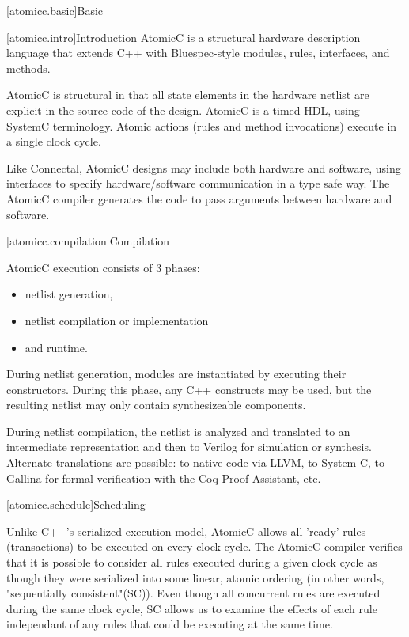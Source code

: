 [atomicc.basic]{Basic}

[atomicc.intro]{Introduction}
AtomicC is a structural hardware description language that extends C++
with Bluespec-style\cite{Bluespec:www,Hoe:Thesis,HoeArvind:TRS_Synthesis2}
modules, rules, interfaces, and methods.

AtomicC is structural in that all state elements in the hardware
netlist are explicit in the source code of the design. AtomicC is a
timed HDL, using SystemC terminology. 
Atomic actions (rules and method invocations) execute in a single clock cycle.

Like Connectal, AtomicC designs may include both hardware and
software, using interfaces to specify hardware/software communication
in a type safe way. The AtomicC compiler generates the code to pass
arguments between hardware and software.

[atomicc.compilation]{Compilation}

AtomicC execution consists of 3 phases:
\begin{itemize}
\item netlist generation, 
\item netlist compilation or implementation
\item and runtime.
\end{itemize}

During netlist
generation, modules are instantiated by executing their
constructors. During this phase, any C++ constructs may be used, but
the resulting netlist may only contain synthesizeable components.

During netlist compilation, the netlist is analyzed and translated to
an intermediate representation and then to Verilog for simulation or
synthesis. Alternate translations are possible: to native code via
LLVM, to System C, to Gallina for formal verification with the Coq
Proof Assistant, etc.

[atomicc.schedule]{Scheduling}

Unlike C++'s serialized execution model, AtomicC allows all 'ready' rules (transactions) to be executed on
every clock cycle.  The AtomicC compiler verifies that it is possible to consider
all rules executed during a given clock cycle
as though they were serialized into some linear, atomic ordering (in other words, "sequentially consistent"(SC)).
Even though all concurrent rules are executed during the same clock cycle, SC allows us to examine the
effects of each rule independant of any rules that could be executing at the same time.

